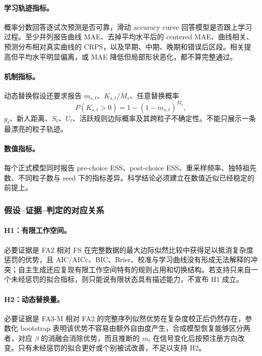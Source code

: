 \paragraph{学习轨迹指标。}
概率分数回答逐试次预测是否可靠，滑动 accuracy curve 回答模型是否跟上学习过程。至少并列报告曲线 MAE、去掉平均水平后的 centered MAE、曲线相关、预测分布相对真实曲线的 CRPS，以及早期、中期、晚期和错误后区段。相关提高但平均水平明显偏离，或 MAE 降低但局部形状恶化，都不算完整通过。

\paragraph{机制指标。}
动态替换假设还要求报告 $m_{s,t}$、$K_{s,t}/M_s$、任意替换概率
\begin{equation}
P(K_{s,t}>0)=1-(1-m_{s,t})^{M_s},
\label{eq:model0809-any-replacement}
\end{equation}
$g_t$、新人距离、$S_t$、$U_t$、活跃规则边际概率及其跨粒子不确定性。不能只展示一条最漂亮的粒子轨迹。

\paragraph{数值指标。}
每个正式模型同时报告 pre-choice ESS、post-choice ESS、重采样频率、独特祖先数、不同粒子数与 seed 下的指标差异。科学结论必须建立在数值近似已经稳定的前提上。


\subsubsection{假设--证据--判定的对应关系}

\paragraph{H1：有限工作空间。}
必要证据是 FA2 相对 FS 在完整数据的最大边际似然比较中获得足以抵消复杂度惩罚的优势，且 AIC/AICc、BIC、Brier、校准与学习曲线没有形成无法解释的冲突；自主生成还应复现有限工作空间特有的规则占用和切换结构。若支持只来自一个未经惩罚的拟合指标，则只能说有限状态具有描述能力，不宣布 H1 成立。

\paragraph{H2：动态替换量。}
必要证据是 FA3-M 相对 FA2 的完整序列似然优势在复杂度校正后仍然存在，参数化 bootstrap 表明该优势不容易由额外自由度产生，合成模型恢复能够区分两者，对应 $\beta$ 的消融会消除优势，而且推断的 $m_t$ 在信号变化后按预注册方向改变。只有未经惩罚的拟合更好或个别被试改善，不足以支持 H2。

